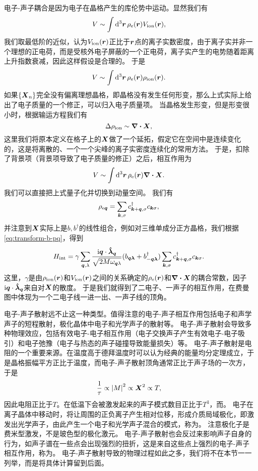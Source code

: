 电子-声子耦合是因为电子在晶格产生的库伦势中运动。显然我们有
\[
    V \sim \int \dd[3]{\vb*{r}} \rho_\text{e}(\vb*{r}) V_\text{ion}(\vb*{r}),
\]
我们取最低阶的近似，认为$V_\text{ion}(\vb*{r})$正比于$\vb*{r}$点的离子实数密度，由于离子实并非一个理想的正电荷，而是受核外电子屏蔽的一个正电荷，离子实产生的电势随着距离上升指数衰减，因此这样假设是合理的。
于是
\[
    V \sim \int \dd[3]{\vb*{r}} \rho_\text{e}(\vb*{r}) \rho_\text{ion}(\vb*{r}).
\]
如果$\{\vb*{X}_n\}$完全没有偏离理想晶格，即晶格没有发生任何形变，那么上式实际上给出了电子质量的一个修正，可以归入电子质量项。
当晶格发生形变，但是形变很小时，根据输运方程我们有
\[
    \Delta \rho_\text{ion} \sim \div{\vb*{X}},
\]
这里我们将原本定义在格子上的$\vb*{X}$做了一个延拓，假定它在空间中是连续变化的，这是将离散的、一个一个尖峰的离子实密度连续化的常用方法。
于是，扣除了背景项（背景项导致了电子质量的修正）之后，相互作用为
\[
    V \sim \int \dd[3]{\vb*{r}} \rho_\text{e}(\vb*{r}) \div{\vb*{X}}.
\]
我们可以直接把上式量子化并切换到动量空间。
我们有
\begin{equation}
    {\rho}_{\text{e} \vb*{q}} = \sum_{\vb*{k}, \sigma} {c}^\dagger_{\vb*{k} + \vb*{q}, \sigma} {c}_{\vb*{k} \sigma},
\end{equation}
并注意到${\vb*{X}}$实际上是${b}, {b}^\dagger$的线性组合，例如对三维单成分正方晶格，我们根据\eqref{eq:transform-b-pq}，得到
\begin{equation}
    {H}_\text{int} = \gamma \sum_{\vb*{q}, \lambda} \frac{\mathrm{i} \vb*{q} \cdot \vu*{\lambda}_{\vb*{q}}}{\sqrt{2 M \omega_{\vb*{q} \lambda}}} ({b}_{\vb*{q} \vb*{\lambda}} + {b}^\dagger_{-\vb*{q} \vb*{\lambda}}) \sum_{\vb*{k}, \sigma}  {c}^\dagger_{\vb*{k} + \vb*{q}, \sigma} {c}_{\vb*{k} \sigma} .
    \label{eq:simple-phonon-electron-int}
\end{equation}
这里，$\gamma$是由$\rho_\text{ion}(\vb*{r})$和$V_\text{ion}(\vb*{r})$之间的关系确定的$\rho_\text{e}(\vb*{r})$和$\div{\vb*{X}}$的耦合常数，因子$\mathrm{i} \vb*{q} \cdot \vu*{\lambda}_{\vb*{q}}$来自对$\vb*{X}$的散度。
于是我们就得到了二电子、一声子的相互作用，在费曼图中体现为一个二电子线一进一出、一声子线的顶角。

电子-声子散射远不止这一种类型。值得注意的电子-声子相互作用包括电子和声学声子的短程散射，极化晶体中电子和光学声子的散射等。
电子-声子散射会导致多种物理效应，包括有效电子-电子相互作用（电子交换声子产生有效电子-电子吸引）和电子弛豫（电子与热态的声子碰撞导致能量损失）等。
电子-声子散射是电阻的一个重要来源。在温度高于德拜温度时可以认为经典的能量均分定理成立，于是晶格振幅平方正比于温度，而电子-声子散射顶角通常正比于声子场的一次方，于是
\[
    \frac{1}{\tau} \propto \abs{M}^2 \propto \vb*{X}^2 \propto T,
\]
因此电阻正比于$T$。在低温下会被激发起来的声子模式数目正比于$T^3$，而。
电子在离子晶体中移动时，将让周围的正负离子产生相对位移，形成介质局域极化，即激发出光学声子，由此产生一个电子和光学声子混合的模式，称为。
注意极化子是费米型激发，不是玻色型的极化激元。
电子-声子散射也会反过来影响声子自身的行为，如声子谱在一些点会出现强烈的扭折，这是来自这些点上强烈的电子-声子相互作用，称为。
电子-声子散射导致的物理过程如此之多，我们将不在本节一一列举，而是将具体计算留到后面。

